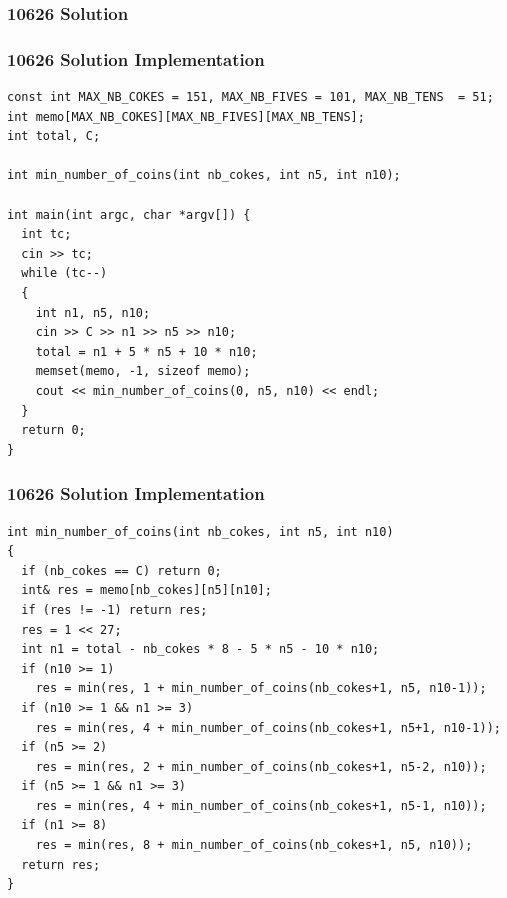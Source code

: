 \documentclass{beamer}
\newcommand{\uvalink}[2]{UVa Online Judge (http://uva.onlinejudge.org)
  problem number \href{#2}{\textcolor{blue}{#1}.}}
\newcounter{exo}
\newcommand{\exo}{
  \addtocounter{exo}{1}
  Exercice \arabic{exo}
}
\begin{document}

\ifanswers

\begin{frame}%
\frametitle{10626 Solution}

\end{frame}

\begin{frame}[fragile]
\frametitle{10626 Solution Implementation}

\scriptsize
\begin{lstlisting}
const int MAX_NB_COKES = 151, MAX_NB_FIVES = 101, MAX_NB_TENS  = 51;
int memo[MAX_NB_COKES][MAX_NB_FIVES][MAX_NB_TENS];
int total, C;

int min_number_of_coins(int nb_cokes, int n5, int n10);

int main(int argc, char *argv[]) {
  int tc;
  cin >> tc;
  while (tc--)
  {
    int n1, n5, n10;
    cin >> C >> n1 >> n5 >> n10;
    total = n1 + 5 * n5 + 10 * n10;
    memset(memo, -1, sizeof memo);
    cout << min_number_of_coins(0, n5, n10) << endl;
  }
  return 0;
}
\end{lstlisting}

\end{frame}

\begin{frame}[fragile]
\frametitle{10626 Solution Implementation}

\scriptsize
\begin{lstlisting}
int min_number_of_coins(int nb_cokes, int n5, int n10)
{
  if (nb_cokes == C) return 0;
  int& res = memo[nb_cokes][n5][n10];
  if (res != -1) return res;
  res = 1 << 27;
  int n1 = total - nb_cokes * 8 - 5 * n5 - 10 * n10;
  if (n10 >= 1)
    res = min(res, 1 + min_number_of_coins(nb_cokes+1, n5, n10-1));
  if (n10 >= 1 && n1 >= 3)
    res = min(res, 4 + min_number_of_coins(nb_cokes+1, n5+1, n10-1));
  if (n5 >= 2)
    res = min(res, 2 + min_number_of_coins(nb_cokes+1, n5-2, n10));
  if (n5 >= 1 && n1 >= 3)
    res = min(res, 4 + min_number_of_coins(nb_cokes+1, n5-1, n10));
  if (n1 >= 8)
    res = min(res, 8 + min_number_of_coins(nb_cokes+1, n5, n10));
  return res;
}
\end{lstlisting}

\end{frame}
\end{document}
